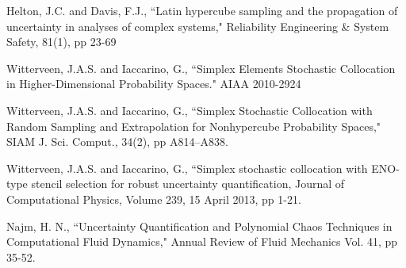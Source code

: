 \documentclass[]{aiaa-tc}%
\begin{document}
\begin{thebibliography}{9}
Helton, J.C. and Davis, F.J., ``Latin hypercube sampling and the propagation of uncertainty in analyses of complex systems," Reliability Engineering \& System Safety, 81(1), pp 23-69

Witterveen, J.A.S. and Iaccarino, G., ``Simplex Elements Stochastic Collocation in Higher-Dimensional Probability Spaces." AIAA 2010-2924

Witterveen, J.A.S. and Iaccarino, G., ``Simplex Stochastic Collocation with Random Sampling and Extrapolation for Nonhypercube Probability Spaces," SIAM J. Sci. Comput., 34(2), pp A814–A838.

Witterveen, J.A.S. and Iaccarino, G., ``Simplex stochastic collocation with ENO-type stencil selection for robust uncertainty quantification, Journal of Computational Physics, Volume 239, 15 April 2013, pp 1-21.

Najm, H. N., ``Uncertainty Quantification and Polynomial Chaos Techniques in Computational Fluid Dynamics," Annual Review of Fluid Mechanics
Vol. 41, pp 35-52. 


\end{thebibliography}
\end{document}

